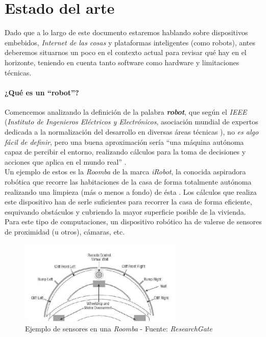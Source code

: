 \chapter{Estado del arte}

Dado que a lo largo de este documento estaremos hablando sobre dispositivos embebidos, \textit{Internet de las cosas} y plataformas inteligentes (como robots), antes deberemos situarnos un poco en el contexto actual para revisar qué hay en el horizonte, teniendo en cuenta tanto software como hardware y limitaciones técnicas.\\

\subsubsection{¿Qué es un ``robot''?}

Comencemos analizando la definición de la palabra \textbf{\textit{robot}}, que según el \textit{IEEE} (\textit{Instituto de Ingenieros Eléctricos y Electrónicos}, asociación mundial de expertos dedicada a la normalización del desarrollo en diversas áreas técnicas \cite{ieee}), no \textit{es algo fácil de definir}, pero una buena aproximación sería ``una máquina autónoma capaz de percibir el entorno, realizando cálculos para la toma de decisiones y acciones que aplica en el mundo real'' \cite{whats_a_robot}.\\

Un ejemplo de estos es la \textit{Roomba} de la marca \textit{iRobot}, la conocida aspiradora robótica que recorre las habitaciones de la casa de forma totalmente autónoma realizando una limpieza (más o menos a fondo) de ésta \cite{roomba}. Los cálculos que realiza este dispositivo han de serle suficientes para recorrer la casa de forma eficiente, esquivando obstáculos y cubriendo la mayor superficie posible de la vivienda. Para este tipo de computaciones, un dispositivo robótico ha de valerse de sensores de proximidad (u otros), cámaras, etc.\\

\begin{figure}[h]
	\centering
	\includegraphics[width=0.7\textwidth]{imagenes/irobot-sensors.png}
	\caption{Ejemplo de sensores en una \textit{Roomba} - Fuente: \textit{ResearchGate} \cite{roomba-sensors-rg}}
\end{figure}

